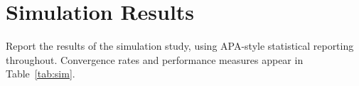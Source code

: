 \section{Simulation Results}

Report the results of the simulation study, using APA-style
statistical reporting throughout. Convergence rates and performance
measures appear in Table~\ref{tab:sim}.



